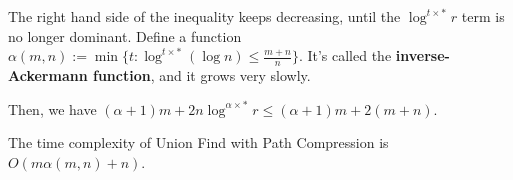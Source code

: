 The right hand side of the inequality keeps decreasing, until the $\log^{t\times *}r$ term is no longer dominant. Define a function $\alpha(m,n) := \min\{ t : \log^{t\times *} (\log n) \leq \frac{m+n}{n} \}$. It's called the \textbf{inverse-Ackermann function}, and it grows very slowly.

Then, we have $(\alpha + 1)m + 2n\log^{\alpha\times *} r \leq (\alpha + 1)m + 2(m+n)$.

\begin{theorem}
	The time complexity of Union Find with Path Compression is $O(m\alpha(m,n) + n)$.
\end{theorem}

